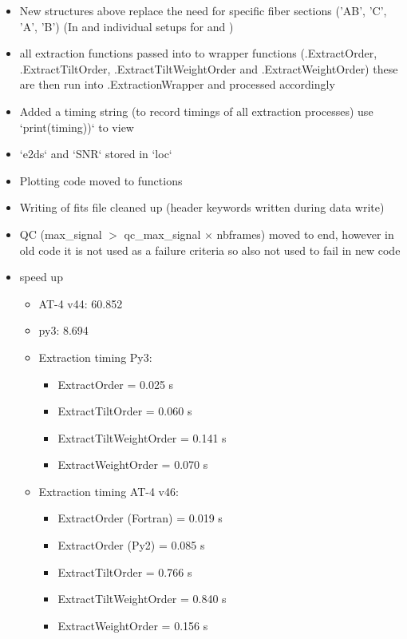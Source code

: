 \begin{itemize}
\item New structures above replace the need for specific fiber sections ('AB', 'C', 'A', 'B') (In \calextractRAWALL and individual setups for \calextractRAWAB and \calextractRAWC)

\item all extraction functions passed into \spirouEXTOR to wrapper functions (\spirouEXTOR.ExtractOrder, \spirouEXTOR.ExtractTiltOrder, \spirouEXTOR.ExtractTiltWeightOrder and \spirouEXTOR.ExtractWeightOrder) these are then run into \spirouEXTOR.ExtractionWrapper and processed accordingly

\item Added a timing string (to record timings of all extraction processes) use `print(timing))` to view
    
\item `e2ds` and `SNR` stored in `loc`

\item Plotting code moved to \spirouPlot functions

\item Writing of fits file cleaned up (header keywords written during data write)

\item QC (max\_signal $>$ qc\_max\_signal $\times$ nbframes) moved to end, however in old code it is not used as a failure criteria so also not used to fail in new code

\item speed up
	\begin{itemize}
	\item AT-4 v44: 60.852
	\item py3: 8.694

	\item Extraction timing Py3:
		\begin{itemize}
		\item ExtractOrder = 0.025 s
		\item ExtractTiltOrder = 0.060 s
		\item ExtractTiltWeightOrder = 0.141 s
		\item ExtractWeightOrder = 0.070 s
         \end{itemize}

	\item Extraction timing AT-4 v46:
		\begin{itemize}
		\item ExtractOrder (Fortran) = 0.019 s
		\item ExtractOrder (Py2) = 0.085 s
		\item ExtractTiltOrder = 0.766 s
		\item ExtractTiltWeightOrder = 0.840 s
		\item ExtractWeightOrder = 0.156 s
         \end{itemize}


\end{itemize}
\end{itemize}

